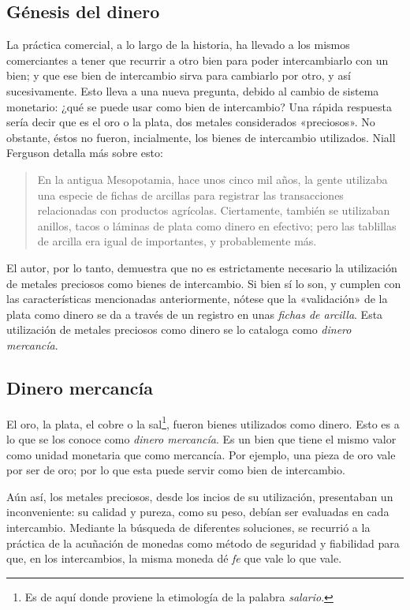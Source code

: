 \documentclass[12pt,a4paper,twoside]{book}
\begin{document}
\subsection{Génesis del dinero}
La práctica comercial, a lo largo de la historia, ha llevado a los mismos comerciantes a tener que recurrir a otro bien para poder intercambiarlo con un bien; y que ese bien de intercambio sirva para cambiarlo por otro, y así sucesivamente. Esto lleva a una nueva pregunta, debido al cambio de sistema monetario: ¿qué se puede usar como bien de intercambio? Una rápida respuesta sería decir que es el oro o la plata, dos metales considerados «preciosos». No obstante, éstos no fueron, incialmente, los bienes de intercambio utilizados. Niall Ferguson detalla más sobre esto:

\begin{quotation}
En la antigua Mesopotamia, hace unos cinco mil años, la gente utilizaba una especie de fichas de arcillas para registrar las transacciones relacionadas con productos agrícolas. Ciertamente, también se utilizaban anillos, tacos o láminas de plata como dinero en efectivo; pero las tablillas de arcilla era igual de importantes, y probablemente más. \cite[pág. 44]{triunfo-dinero}
\end{quotation}

El autor, por lo tanto, demuestra que no es estrictamente necesario la utilización de metales preciosos como bienes de intercambio. Si bien sí lo son, y cumplen con las características mencionadas anteriormente, nótese que la «validación» de la plata como dinero se da a través de un registro en unas \textit{fichas de arcilla}. Esta utilización de metales preciosos como dinero se lo cataloga como \textit{dinero mercancía}.

\subsection{Dinero mercancía}
El oro, la plata, el cobre o la sal\footnote{Es de aquí donde proviene la etimología de la palabra \textit{salario}.}, fueron bienes utilizados como dinero. Esto es a lo que se los conoce como \textit{dinero mercancía}. Es un bien que tiene el mismo valor como unidad monetaria que como mercancía. Por ejemplo, una pieza de oro vale por ser de oro; por lo que esta puede servir como bien de intercambio. 

Aún así, los metales preciosos, desde los incios de su utilización, presentaban un inconveniente: su calidad y pureza, como su peso, debían ser evaluadas en cada intercambio. Mediante la búsqueda de diferentes soluciones, se recurrió a la práctica de la acuñación de monedas como método de seguridad y fiabilidad para que, en los intercambios, la misma moneda dé \textit{fe} que vale lo que vale.
\end{document}
